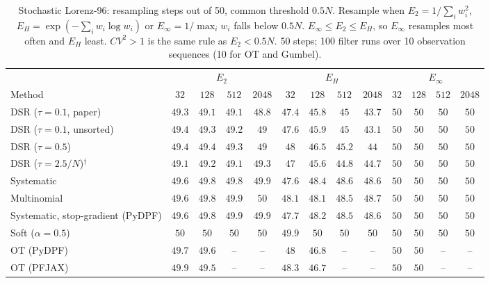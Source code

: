 \begin{table}[ht]
\centering
\small
\caption{Stochastic Lorenz-96: resampling steps out of 50, common threshold $0.5N$. Resample when $E_2=1/\sum_iw_i^2$, $E_H=\exp(-\sum_iw_i\log w_i)$ or $E_\infty=1/\max_iw_i$ falls below $0.5N$. $E_\infty\le E_2\le E_H$, so $E_\infty$ resamples most often and $E_H$ least. $CV^2>1$ is the same rule as $E_2<0.5N$. 50 steps; 100 filter runs over 10 observation sequences (10 for OT and Gumbel).}
\label{tab:trigger-fixed-lorenz96-resampling_steps}
\begin{adjustbox}{max width=\linewidth}
\begin{tabular}{lcccc|cccc|cccc}
\toprule
 & \multicolumn{4}{c}{$E_2$} & \multicolumn{4}{c}{$E_H$} & \multicolumn{4}{c}{$E_\infty$} \\
\cmidrule(lr){2-5} \cmidrule(lr){6-9} \cmidrule(lr){10-13}
Method & $32$ & $128$ & $512$ & $2048$ & $32$ & $128$ & $512$ & $2048$ & $32$ & $128$ & $512$ & $2048$ \\
\midrule
DSR ($\tau{=}0.1$, paper) & $49.3$ & $49.1$ & $49.1$ & $48.8$ & $47.4$ & $45.8$ & $45$ & $43.7$ & $50$ & $50$ & $50$ & $50$ \\
DSR ($\tau{=}0.1$, unsorted) & $49.4$ & $49.3$ & $49.2$ & $49$ & $47.6$ & $45.9$ & $45$ & $43.1$ & $50$ & $50$ & $50$ & $50$ \\
DSR ($\tau{=}0.5$) & $49.4$ & $49.4$ & $49.3$ & $49$ & $48$ & $46.5$ & $45.2$ & $44$ & $50$ & $50$ & $50$ & $50$ \\
DSR ($\tau{=}2.5/N$)$^\dagger$ & $49.1$ & $49.2$ & $49.1$ & $49.3$ & $47$ & $45.6$ & $44.8$ & $44.7$ & $50$ & $50$ & $50$ & $50$ \\
\midrule
Systematic & $49.6$ & $49.8$ & $49.8$ & $49.9$ & $47.6$ & $48.4$ & $48.6$ & $48.6$ & $50$ & $50$ & $50$ & $50$ \\
Multinomial & $49.6$ & $49.8$ & $49.9$ & $50$ & $48.1$ & $48.1$ & $48.5$ & $48.7$ & $50$ & $50$ & $50$ & $50$ \\
Systematic, stop-gradient (PyDPF) & $49.6$ & $49.8$ & $49.9$ & $49.9$ & $47.7$ & $48.2$ & $48.5$ & $48.6$ & $50$ & $50$ & $50$ & $50$ \\
Soft ($\alpha{=}0.5$) & $50$ & $50$ & $50$ & $50$ & $49.9$ & $50$ & $50$ & $50$ & $50$ & $50$ & $50$ & $50$ \\
OT (PyDPF) & $49.7$ & $49.6$ & -- & -- & $48$ & $46.8$ & -- & -- & $50$ & $50$ & -- & -- \\
OT (PFJAX) & $49.9$ & $49.5$ & -- & -- & $48.3$ & $46.7$ & -- & -- & $50$ & $50$ & -- & -- \\

\end{tabular}
\end{adjustbox}
\end{table}
